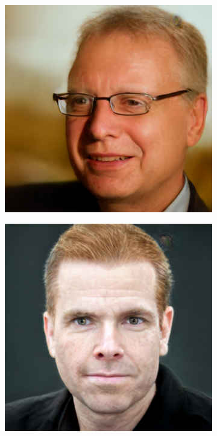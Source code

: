 \begin{figure}[h!]
\begin{subfigure}[b]{0.24\textwidth}
    \end{subfigure}
    \begin{subfigure}[b]{0.24\textwidth}
        \includegraphics[width=\textwidth]{fig/stylegan/faceedit/uffe-glasses}

    \end{subfigure}

    \begin{subfigure}[b]{0.24\textwidth}
        \includegraphics[width=\textwidth]{fig/stylegan/faceedit/inger-gender}


\end{subfigure}
\end{figure}
